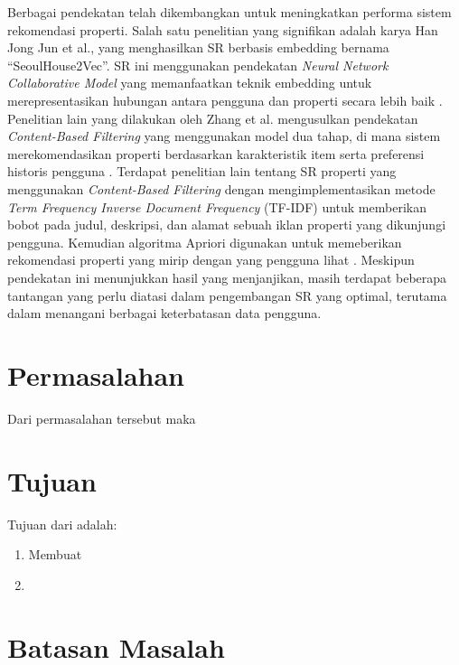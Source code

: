 Berbagai pendekatan telah dikembangkan untuk meningkatkan performa sistem rekomendasi properti. 
Salah satu penelitian yang signifikan adalah karya Han Jong Jun et al., yang menghasilkan SR berbasis embedding bernama “SeoulHouse2Vec”. 
SR ini menggunakan pendekatan \emph{Neural Network Collaborative Model} yang memanfaatkan teknik embedding untuk merepresentasikan hubungan antara pengguna dan properti secara lebih baik \parencite{Jun2020}. 
Penelitian lain yang dilakukan oleh Zhang et al. mengusulkan pendekatan \emph{Content-Based Filtering} yang menggunakan model dua tahap, di mana sistem merekomendasikan properti berdasarkan karakteristik item serta preferensi historis pengguna \parencite{Zhang2019}. 
Terdapat penelitian lain tentang SR properti yang menggunakan \emph{Content-Based Filtering} dengan mengimplementasikan metode \emph{Term Frequency Inverse Document Frequency} (TF-IDF) untuk memberikan bobot pada judul, deskripsi, dan alamat sebuah iklan properti yang dikunjungi pengguna. 
Kemudian algoritma Apriori digunakan untuk memeberikan rekomendasi properti yang mirip dengan yang pengguna lihat \parencite{Badriyah2018}. 
Meskipun pendekatan ini menunjukkan hasil yang menjanjikan, masih terdapat beberapa tantangan yang perlu diatasi dalam pengembangan SR yang optimal, terutama dalam menangani berbagai keterbatasan data pengguna.

\section{Permasalahan}
\label{sec:permasalahan}

Dari permasalahan tersebut maka \lipsum[1][1-6]

\section{Tujuan}
\label{sec:Tujuan}

Tujuan dari \lipsum[1][1-3] adalah:

\begin{enumerate}[nolistsep]

  \item Membuat \lipsum[2][1-3]

  \item \lipsum[3][1-3]

\end{enumerate}

\section{Batasan Masalah}
\label{sec:batasanmasalah}

